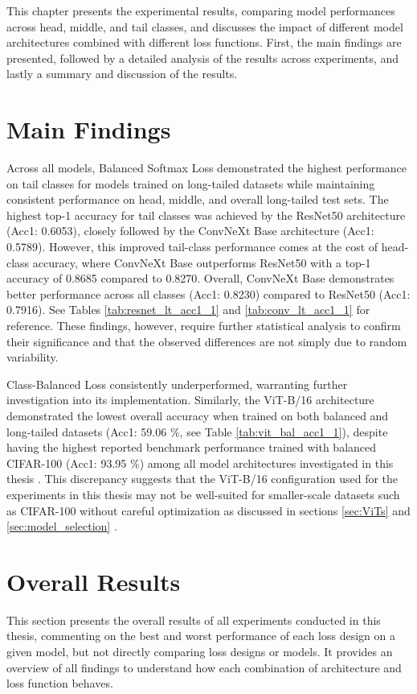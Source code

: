 This chapter presents the experimental results, comparing model performances across head, middle, and tail classes, and discusses the impact of different model architectures combined with different loss functions. First, the main findings are presented, followed by a detailed analysis of the results across experiments, and lastly a summary and discussion of the results. 

\section{Main Findings}
Across all models, Balanced Softmax Loss demonstrated the highest performance on tail classes for models trained on long-tailed datasets while maintaining consistent performance on head, middle, and overall long-tailed test sets. The highest top-1 accuracy for tail classes was achieved by the ResNet50 architecture (Acc1: 0.6053), closely followed by the ConvNeXt Base architecture (Acc1: 0.5789). However, this improved tail-class performance comes at the cost of head-class accuracy, where ConvNeXt Base outperforms ResNet50 with a top-1 accuracy of 0.8685 compared to 0.8270. Overall, ConvNeXt Base demonstrates better performance across all classes (Acc1: 0.8230) compared to ResNet50 (Acc1: 0.7916). See Tables \ref{tab:resnet_lt_acc1_1} and \ref{tab:conv_lt_acc1_1} for reference. These findings, however, require further statistical analysis to confirm their significance and that the observed differences are not simply due to random variability.

Class-Balanced Loss consistently underperformed, warranting further investigation into its implementation. Similarly, the ViT-B/16 architecture demonstrated the lowest overall accuracy when trained on both balanced and long-tailed datasets (Acc1: 59.06 \%, see Table \ref{tab:vit_bal_acc1_1}), despite having the highest reported benchmark performance trained with balanced CIFAR-100 (Acc1: 93.95 \%) among all model architectures investigated in this thesis \cite{Tseng_2022}. This discrepancy suggests that the ViT-B/16 configuration used for the experiments in this thesis may not be well-suited for smaller-scale datasets such as CIFAR-100 without careful optimization as discussed in sections \ref{sec:ViTs} and \ref{sec:model_selection} .

\section{Overall Results}
This section presents the overall results of all experiments conducted in this thesis, commenting on the best and worst performance of each loss design on a given model, but not directly comparing loss designs or models. It provides an overview of all findings to understand how each combination of architecture and loss function behaves.


